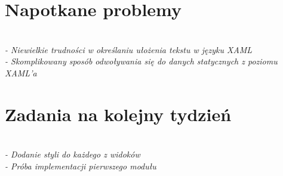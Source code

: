 \documentclass[12pt,a4paper]{mwart}
\begin{document}
\section{Napotkane problemy}

\textit{\\
- Niewielkie trudności w określaniu ułożenia tekstu w języku XAML \\
- Skomplikowany sposób odwoływania się do danych statycznych z poziomu XAML'a
} %

\section{Zadania na kolejny tydzień}

\textit{\\
- Dodanie styli do każdego z widoków \\
- Próba implementacji pierwszego modułu
} %
\end{document}
